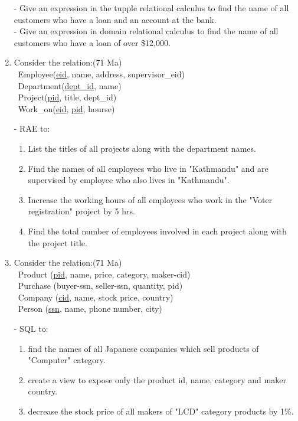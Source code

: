 \documentclass[12pt]{article}
\newcommand{\enter}{\\\textcolor{white}{1}}
\begin{document}
\begin{enumerate}
        - Give an expression in the tupple relational calculus to find the name of all customers who have a loan and an account at the bank.\\
        - Give an expression in domain relational calculus to find the name of all customers who have a loan of over \$12,000.\\

    \item Consider the relation:\hfill(71 Ma)
        \enter Employee(\underline{eid}, name, address, supervisor\_eid)
        \enter Department(\underline{dept\_id}, name)
        \enter Project(\underline{pid}, title, dept\_id)
        \enter Work\_on(\underline{eid}, \underline{pid}, hourse)

        - RAE to:
        \begin{enumerate}[noitemsep, topsep = 0pt, label = \alph*.]
            \item List the titles of all projects along with the department names.
            \item Find the names of all employees who live in "Kathmandu" and are supervised by employee who also lives in "Kathmandu".
            \item Increase the working hours of all employees who work in the "Voter registration" project by 5 hrs.
            \item Find the total number of employees involved in each project along with the project title.
        \end{enumerate}

    \item Consider the relation:\hfill(71 Ma)
        \enter Product (\underline{pid}, name, price, category, maker-cid)
        \enter Purchase (buyer-ssn, seller-ssn, quantity, pid)
        \enter Company (\underline{cid}, name, stock price, country)
        \enter Person (\underline{ssn}, name, phone number, city)

        - SQL to:
        \begin{enumerate}[noitemsep, topsep = 0pt, label = \alph*.]
            \item find the names of all Japanese companies which sell products of "Computer" category.
            \item create a view to expose only the product id, name, category and maker country.
            \item decrease the stock price of all makers of "LCD" category products by 1\%.
        \end{enumerate}


\end{enumerate}
\end{document}

